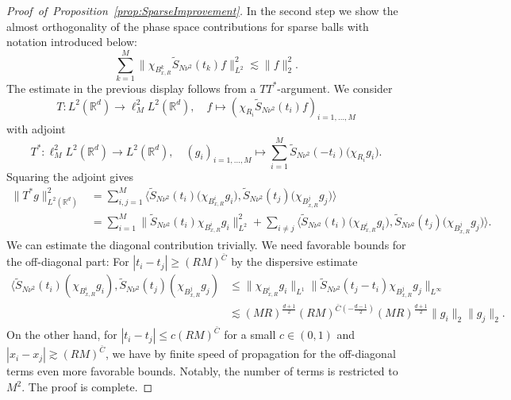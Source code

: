 \documentclass{amsart}
\numberwithin{equation}{section}
\theoremstyle{definition}
\newcommand{\R}{\mathbb{R}}
\begin{document}
\begin{proof}[Proof~of~Proposition~\ref{prop:SparseImprovement}]
In the second step we show the almost orthogonality of the phase space contributions for sparse balls with notation introduced below:
\begin{equation}
\label{eq:AlmostOrthogonalityPhaseSpace}
    \sum_{k=1}^M \| \chi_{B_{x,R}^k} \tilde{S}_{N \nu^2}(t_k) f \|_{L^2}^2 \lesssim \| f \|_2^2.
\end{equation}
The estimate in the previous display follows from a $TT^*$-argument. We consider
\begin{equation*}
    T: L^2(\R^d) \to \ell^2_M L^2(\R^d), \quad f \mapsto ( \chi_{R_i} \tilde{S}_{N \nu^2}(t_i) f )_{i=1,\ldots,M}
\end{equation*}
with adjoint
\begin{equation*}
    T^*: \ell^2_M L^2(\R^d) \to L^2(\R^d), \quad (g_i)_{i=1,\ldots,M} \mapsto \sum_{i=1}^M \tilde{S}_{N \nu^2}(-t_i) \big( \chi_{R_i} g_i \big).
\end{equation*}
Squaring the adjoint gives
\begin{equation*}
\begin{split}
    \| T^* g \|_{L^2(\R^d)}^2 &= \sum_{i,j=1}^M \langle \tilde{S}_{N \nu^2}(t_i) \big( \chi_{B_{x,R}^i} g_i \big), \tilde{S}_{N \nu^2}(t_j) \big( \chi_{B_{x,R}^j} g_j \big) \rangle \\
    &= \sum_{i=1}^M \| \tilde{S}_{N \nu^2}(t_i) \chi_{B_{x,R}^i} g_i \|_{L^2}^2 + \sum_{i \neq j} \langle \tilde{S}_{N \nu^2}(t_i) \big( \chi_{B_{x,R}^i} g_i \big), \tilde{S}_{N \nu^2}(t_j) \big( \chi_{B_{x,R}^j} g_j \big) \rangle. 
\end{split}
\end{equation*}
We can estimate the diagonal contribution trivially. We need favorable bounds for the off-diagonal part: For $|t_i - t_j| \geq (RM)^{\bar{C}}$ by the dispersive estimate
\begin{equation*}
    \begin{split}
    \langle \tilde{S}_{N \nu^2}(t_i) (\chi_{B_{x,R}^i} g_i), \tilde{S}_{N \nu^2}(t_j) ( \chi_{B_{x,R}^j} g_j) &\leq \| \chi_{B_{x,R}^i} g_i \|_{L^1} \| \tilde{S}_{N \nu^2}(t_j-t_i) \chi_{B_{x,R}^j} g_j \|_{L^{\infty}} \\
    &\lesssim (MR)^{\frac{d+1}{2}} (RM)^{\bar{C}( - \frac{d-1}{2}) } (MR)^{\frac{d+1}{2}} \| g_i \|_2 \| g_j \|_2.
    \end{split}
\end{equation*}
On the other hand, for $|t_i-t_j| \leq c (RM)^{\bar{C}}$ for a small $c \in (0,1)$ and $|x_i-x_j| \gtrsim (RM)^{\bar{C}}$, we have by finite speed of propagation for the off-diagonal terms even more favorable bounds. Notably, the number of terms is restricted to $M^2$. The proof is complete.
\end{proof}
\end{document}
